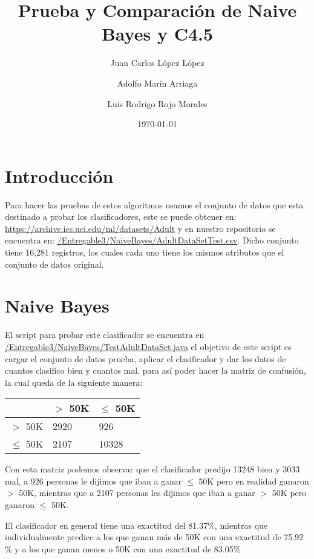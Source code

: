 \documentclass{article}
\title{Prueba y Comparación de Naive Bayes y C4.5}
\author{Juan Carlos López López \and Adolfo Marín Arriaga \and Luis Rodrigo Rojo Morales}
\date{\today\\}
\begin{document}
 \maketitle
 \section{Introducción}
 Para hacer las pruebas de estos algoritmos usamos el conjunto de datos que esta destinado a probar los clasificadores, este se puede obtener en: \href{https://archive.ics.uci.edu/ml/datasets/Adult} {https://archive.ics.uci.edu/ml/datasets/Adult} y en nuestro repositorio se encuentra en: \href{https://github.com/rodrigorojo/ProyectoFinalMineria/blob/master/Entregable3/NaiveBayes/AdultDataSetTest.csv}{/Entregable3/NaiveBayes/AdultDataSetTest.csv}. Dicho conjunto tiene 16,281 registros, los cuales cada uno tiene los mismos atributos que el conjunto de datos original.

 \section{Naive Bayes}
 El script para probar este clasificador se encuentra en \href{https://github.com/rodrigorojo/ProyectoFinalMineria/blob/master/Entregable3/NaiveBayes/TestAdultDataSet.java} {/Entregable3/NaiveBayes/TestAdultDataSet.java} el objetivo de este script es cargar el conjunto de datos prueba, aplicar el clasificador y dar los datos de cuantos clasifico bien y cuantos mal, para así poder hacer la matriz de confusión, la cual queda de la siguiente manera:
 \begin{center}
   \begin{tabular}{|p{2cm}|p{2cm}|p{2cm}|}
     \hline
                  & $>$ 50K & $\leq$ 50K  \\ \hline
      $>$ 50K     & 2920    & 926         \\ \hline
      $\leq$ 50K  & 2107    & 10328        \\ \hline
    \end{tabular}
 \end{center}
 Con esta matriz podemos observar que el clasificador predijo 13248 bien y 3033 mal, a 926 personas le dijimos que iban a ganar $\leq$ 50K pero en realidad ganaron $>$ 50K, mientras que a 2107 personas les dijimos que iban a ganar $>$ 50K pero ganaron $\leq$ 50K.

 El clasificador en general tiene una exactitud del 81.37$\%$, mientras que individualmente predice a los que ganan más de 50K con una exactitud de 75.92$\%$ y a los que ganan menos o 50K con una exactitud de 83.05$\%$
\end{document}

